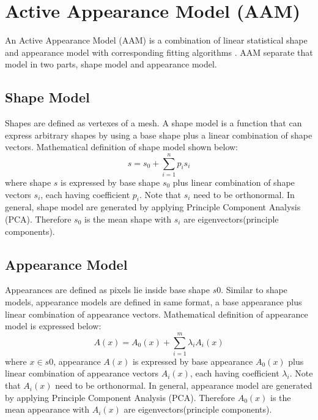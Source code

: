 \section{Active Appearance Model (AAM)}
\label{sec:bg_aam}
An Active Appearance Model (AAM) is a combination of linear statistical shape and appearance model with corresponding fitting algorithms \cite{Matthews2004, Cootes2001}. AAM separate that model in two parts, shape model and appearance model. 

\subsection{Shape Model}
Shapes are defined as vertexes of a mesh. A shape model is a function that can express arbitrary shapes by using a base shape plus a linear combination of shape vectors. Mathematical definition of shape model shown below:
\begin{equation}
s=s_0+\sum^n_{i=1}p_i s_i
\end{equation}
where shape $s$ is expressed by base shape $s_0$ plus linear combination of shape vectors $s_i$, each having coefficient $p_i$. Note that $s_i$ need to be orthonormal. In general, shape model are generated by applying Principle Component Analysis (PCA). Therefore $s_0$ is the mean shape with $s_i$ are eigenvectors(principle components).

\subsection{Appearance Model}
\label{sec:appearance_model}
Appearances are defined as pixels lie inside base shape $s0$. Similar to shape models, appearance models are defined in same format, a base appearance plus linear combination of appearance vectors. Mathematical definition of appearance model is expressed below:
\begin{equation}
A(x)=A_0(x)+\sum^m_{i=1}\lambda_iA_i(x)
\end{equation}
where $x \in s0$, appearance $A(x)$ is expressed by base appearance $A_0(x)$ plus linear combination of appearance vectors $A_i(x)$, each having coefficient $\lambda_i$. Note that $A_i(x)$ need to be orthonormal. In general, appearance model are generated by applying Principle Component Analysis (PCA). Therefore $A_0(x)$ is the mean appearance with $A_i(x)$ are eigenvectors(principle components).


